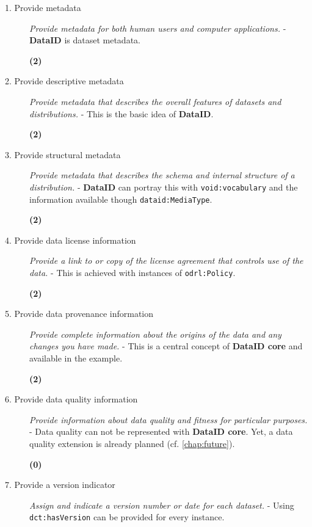 \documentclass[a4paper,english,twoside,BCOR1.5cm,headsepline,DIV12,appendixprefix,final,12pt]{scrbook}
\newcommand{\dataid}{{\ttfamily\bfseries DataID}\xspace}
\newcommand{\core}{{\ttfamily\bfseries DataID core}\xspace}
\newcommand{\prop}[1]{{{\texttt{#1}}}}
\begin{document}
\begin{description}
 \item[1. Provide metadata] \textit{Provide metadata for both human users and computer applications.} - \dataid is dataset metadata.
\begin{flushright}\color{ForestGreen}\textbf{(2)}\end{flushright}
 \item[2. Provide descriptive metadata] \textit{Provide metadata that describes the overall features of datasets and distributions.} - This is the basic idea of \dataid.
\begin{flushright}\color{ForestGreen}\textbf{(2)}\end{flushright}
 \item[3. Provide structural metadata] \textit{Provide metadata that describes the schema and internal structure of a distribution.} - \dataid can portray this with \prop{void:vocabulary} and the information available though \prop{dataid:MediaType}.
\begin{flushright}\color{ForestGreen}\textbf{(2)}\end{flushright}
 \item[4. Provide data license information] \textit{Provide a link to or copy of the license agreement that controls use of the data.} - This is achieved with instances of \prop{odrl:Policy}.
\begin{flushright}\color{ForestGreen}\textbf{(2)}\end{flushright}
 \item[5. Provide data provenance information] \textit{Provide complete information about the origins of the data and any changes you have made.} - This is a central concept of \core and available in the example.
\begin{flushright}\color{ForestGreen}\textbf{(2)}\end{flushright}
 \item[6. Provide data quality information] \textit{Provide information about data quality and fitness for particular purposes.} - Data quality can not be represented with \core. Yet, a data quality extension is already planned (cf. \cref{chap:future}).
\begin{flushright}\color{Mahogany}\textbf{(0)}\end{flushright}
 \item[7. Provide a version indicator] \textit{Assign and indicate a version number or date for each dataset.} - Using \prop{dct:hasVersion} can be provided for every instance.

\end{description}
\end{document}
